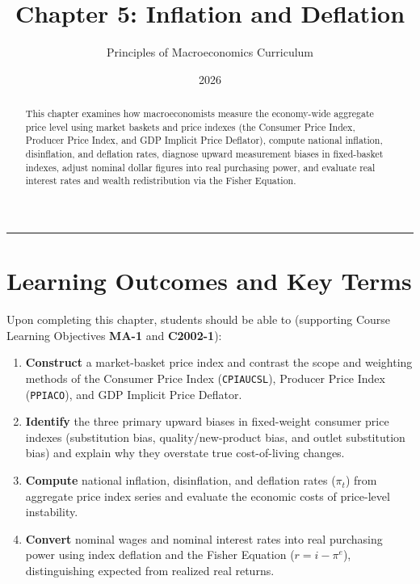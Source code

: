 \documentclass[11pt,letterpaper]{article}
\begin{document}
\title{\Huge\bfseries\color{SlateBlue} Chapter 5: Inflation and Deflation}
\author{\large Principles of Macroeconomics Curriculum}
\date{2026}
\maketitle

\thispagestyle{plain}

\begin{abstract}
This chapter examines how macroeconomists measure the economy-wide aggregate price level using market baskets and price indexes (the Consumer Price Index, Producer Price Index, and GDP Implicit Price Deflator), compute national inflation, disinflation, and deflation rates, diagnose upward measurement biases in fixed-basket indexes, adjust nominal dollar figures into real purchasing power, and evaluate real interest rates and wealth redistribution via the Fisher Equation.
\end{abstract}

\tableofcontents
\vspace{1.5em}
\hrule
\vspace{1.5em}

\section*{Learning Outcomes and Key Terms}

Upon completing this chapter, students should be able to (supporting Course Learning Objectives \textbf{MA-1} and \textbf{C2002-1}):
\begin{enumerate}
    \item \textbf{Construct} a market-basket price index and contrast the scope and weighting methods of the Consumer Price Index (\texttt{CPIAUCSL}), Producer Price Index (\texttt{PPIACO}), and GDP Implicit Price Deflator.
    \item \textbf{Identify} the three primary upward biases in fixed-weight consumer price indexes (substitution bias, quality/new-product bias, and outlet substitution bias) and explain why they overstate true cost-of-living changes.
    \item \textbf{Compute} national inflation, disinflation, and deflation rates ($\pi_t$) from aggregate price index series and evaluate the economic costs of price-level instability.
    \item \textbf{Convert} nominal wages and nominal interest rates into real purchasing power using index deflation and the Fisher Equation ($r = i - \pi^e$), distinguishing expected from realized real returns.
\end{enumerate}
\end{document}
